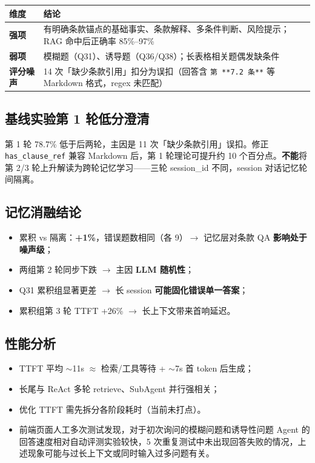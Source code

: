 \documentclass[11pt,a4paper]{ctexart}
\begin{document}
\begin{center}
\begin{tabular}{p{2.5cm}p{10cm}}
\toprule
\textbf{维度} & \textbf{结论} \\
\midrule
\textbf{强项} & 有明确条款锚点的基础事实、条款解释、多条件判断、风险提示；RAG 命中后正确率 85\%--97\% \\
\textbf{弱项} & 模糊题（Q31）、诱导题（Q36/Q38）；长表格相关题偶发缺条件 \\
\textbf{评分噪声} & 14 次「缺少条款引用」扣分为误扣（回答含 \texttt{第 **7.2 条**} 等 Markdown 格式，regex 未匹配） \\
\bottomrule
\end{tabular}
\end{center}

\subsection{基线实验第 1 轮低分澄清}

第 1 轮 78.7\% 低于后两轮，主因是 11 次「缺少条款引用」误扣。修正 \texttt{has\_clause\_ref} 兼容 Markdown 后，第 1 轮理论可提升约 10 个百分点。\textbf{不能}将第 2/3 轮上升解读为跨轮记忆学习——三轮 session\_id 不同，session 对话记忆轮间隔离。

\subsection{记忆消融结论}

\begin{itemize}[nosep]
  \item 累积 vs 隔离：\textbf{+1\%}，错误题数相同（各 9）$\rightarrow$ 记忆层对条款 QA \textbf{影响处于噪声级}；
  \item 两组第 2 轮同步下跌 $\rightarrow$ 主因 \textbf{LLM 随机性}；
  \item Q31 累积组显著更差 $\rightarrow$ 长 session \textbf{可能固化错误单一答案}；
  \item 累积组第 3 轮 TTFT +26\% $\rightarrow$ 长上下文带来首响延迟。
\end{itemize}

\subsection{性能分析}

\begin{itemize}[nosep]
  \item TTFT 平均 $\sim$11s $\approx$ 检索/工具等待 + $\sim$7s 首 token 后生成；
  \item 长尾与 ReAct 多轮 retrieve、SubAgent 并行强相关；
  \item 优化 TTFT 需先拆分各阶段耗时（当前未打点）。
  \item 前端页面人工多次测试发现，对于初次询问的模糊问题和诱导性问题 Agent 的回答速度相对自动评测实验较快，5 次重复测试中未出现回答失败的情况，上述现象可能与过长上下文或同时输入过多问题有关。
\end{itemize}
\end{document}
